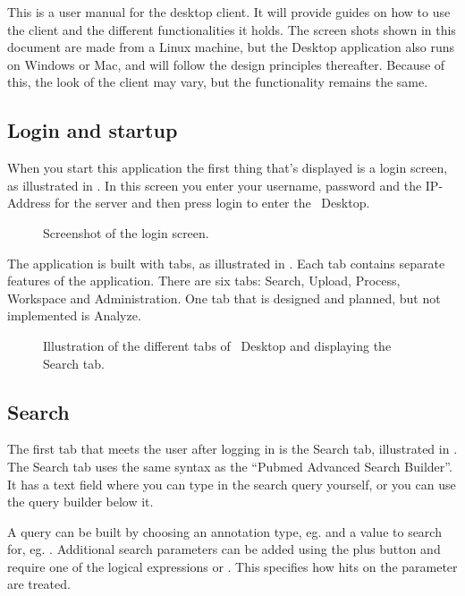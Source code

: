 
This is a user manual for the desktop client. It will provide guides on how to use the client and the different functionalities it holds. The screen shots shown in this document are made from a Linux machine, but the Desktop application also runs on Windows or Mac, and will follow the design principles thereafter. Because of this, the look of the client may vary, but the functionality remains the same.

\subsection{Login and startup}
When you start this application the first thing that's displayed is a login screen, as illustrated in . In this screen you enter your username, password and the IP-Address for the server and then press login to enter the \appName\ Desktop.

\begin{figure}[htb]
	\caption{Screenshot of the login screen.}
	\label{fig:des_login-pic}
\end{figure}
The application is built with tabs, as illustrated in . Each tab contains separate features of the application. There are six tabs: Search, Upload, Process, Workspace and Administration. One tab that is designed and planned, but not implemented is Analyze.
\begin{figure}[htb]
	\caption{Illustration of the different tabs of \appName\ Desktop and displaying the Search tab.}
	\label{fig:des_tabs-view}
\end{figure}
\FloatBarrier

\subsection{Search}
The first tab that meets the user after logging in is the Search tab, illustrated in . The Search tab uses the same syntax as the “Pubmed Advanced Search Builder”\cite{des_pubmed_query}. It has a text field where you can type in the search query yourself, or you can use the query builder below it.

A query can be built by choosing an annotation type, eg.  and a value to search for, eg. . Additional search parameters can be added using the plus button and require one of the logical expressions  or . This specifies how hits on the parameter are treated.

